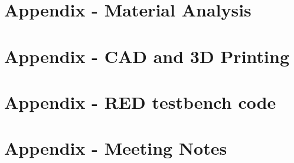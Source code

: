 \documentclass[12pt,a4paper]{scrreprt}
\begin{document}
\chapter{Appendix - Material Analysis}
\label{app:AppendixD}


\chapter{Appendix - CAD and 3D Printing}
\label{app:AppendixE}



\chapter{Appendix - \acf{RED} testbench code}
\label{app:AppendixF}


\chapter{Appendix - Meeting Notes}
\label{app:AppendixG}



\end{document}
